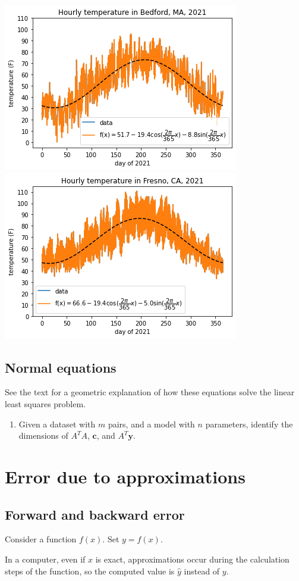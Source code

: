 \documentclass[12pt,letterpaper,noanswers]{exam}
\begin{document}
\includegraphics[width=0.45\linewidth]{img/C03weatherBedfordfit.png}
\includegraphics[width=0.45\linewidth]{img/C03weatherFresnofit.png}



\subsection{Normal equations}

See the text for a geometric explanation of how these equations solve the linear least squares problem.

\begin{enumerate}[resume]
    \item Given a dataset with $m$ pairs, and a model with $n$ parameters, identify the dimensions of $A^TA$, $\mathbf{c}$, and $A^T\mathbf{y}$.    
\end{enumerate}

\section{Error due to approximations}

\subsection{Forward and backward error}

Consider a function $f(x)$.  Set $y = f(x)$.

In a computer, even if $x$ is exact, approximations occur during the calculation steps of the function, so the computed value is $\hat{y}$ instead of $y$.
\end{document}
